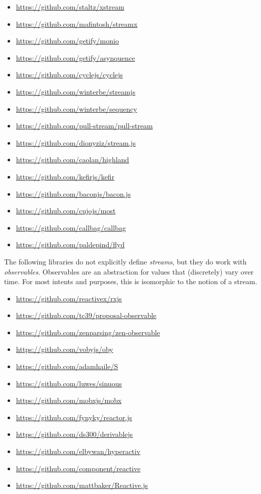 \documentclass[sigplan,screen,10pt,anonymous,review]{acmart}
\begin{document}
\begin{itemize}
    \item \url{https://github.com/staltz/xstream}
    \item \url{https://github.com/mafintosh/streamx}
    \item \url{https://github.com/getify/monio}
    \item \url{https://github.com/getify/asynquence}
    \item \url{https://github.com/cyclejs/cyclejs}
    \item \url{https://github.com/winterbe/streamjs}
    \item \url{https://github.com/winterbe/sequency}
    \item \url{https://github.com/pull-stream/pull-stream}
    \item \url{https://github.com/dionyziz/stream.js}
    \item \url{https://github.com/caolan/highland}
    \item \url{https://github.com/kefirjs/kefir}
    \item \url{https://github.com/baconjs/bacon.js}
    \item \url{https://github.com/cujojs/most}
    \item \url{https://github.com/callbag/callbag}
    \item \url{https://github.com/paldepind/flyd}
\end{itemize}
    
The following libraries do not explicitly define \textit{streams}, but they do work with \textit{observables}. Observables are an abstraction for values that (discretely) vary over time. For most intents and purposes, this is isomorphic to the notion of a stream.

\begin{itemize}
    \item \url{https://github.com/reactivex/rxjs}
    \item \url{https://github.com/tc39/proposal-observable}
    \item \url{https://github.com/zenparsing/zen-observable}
    \item \url{https://github.com/vobyjs/oby}
    \item \url{https://github.com/adamhaile/S}
    \item \url{https://github.com/luwes/sinuous}
    \item \url{https://github.com/mobxjs/mobx}
    \item \url{https://github.com/fynyky/reactor.js}
    \item \url{https://github.com/ds300/derivablejs}
    \item \url{https://github.com/elbywan/hyperactiv}
    \item \url{https://github.com/component/reactive}
    \item \url{https://github.com/mattbaker/Reactive.js}
\end{itemize}
\end{document}
